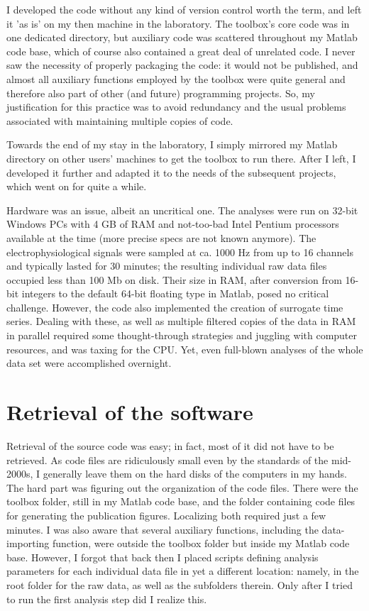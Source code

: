 I developed the code without any kind of version control worth the term, and left it 'as is' on my then machine in the laboratory. The toolbox's core code was in one dedicated directory, but auxiliary code was scattered throughout my Matlab code base, which of course also contained a great deal of unrelated code. I never saw the necessity of properly packaging the code: it would not be published, and almost all auxiliary functions employed by the toolbox were quite general and therefore also part of other (and future) programming projects. So, my justification for this practice was to avoid redundancy and the usual problems associated with maintaining multiple copies of code.

Towards the end of my stay in the laboratory, I simply mirrored my Matlab directory on other users' machines to get the toolbox to run there. After I left, I developed it further and adapted it to the needs of the subsequent projects, which went on for quite a while. 

Hardware was an issue, albeit an uncritical one. The analyses were run on 32-bit Windows PCs with 4 GB of RAM and not-too-bad Intel Pentium processors available at the time (more precise specs are not known anymore). The electrophysiological signals were sampled at ca. 1000 Hz from up to 16 channels and typically lasted for 30 minutes; the resulting individual raw data files occupied less than 100 Mb on disk. Their size in RAM, after conversion from 16-bit integers to the default 64-bit floating type in Matlab, posed no critical challenge. However, the code also implemented the creation of surrogate time series. Dealing with these, as well as multiple filtered copies of the data in RAM in parallel required some thought-through strategies and juggling with computer resources, and was taxing for the CPU. Yet, even full-blown analyses of the whole data set were accomplished overnight.


\section{Retrieval of the software}

Retrieval of the source code was easy; in fact, most of it did not have to be retrieved. As code files are ridiculously small even by the standards of the mid-2000s, I generally leave them on the hard disks of the computers in my hands. The hard part was figuring out the organization of the code files. There were the toolbox folder, still in my Matlab code base, and the folder containing code files for generating the publication figures. Localizing both required just a few minutes. I was also aware that several auxiliary functions, including the data-importing function, were outside the toolbox folder but inside my Matlab code base. However, I forgot that back then I placed scripts defining analysis parameters for each individual data file in yet a different location: namely, in the root folder for the raw data, as well as the subfolders therein. Only after I tried to run the first analysis step did I realize this.

